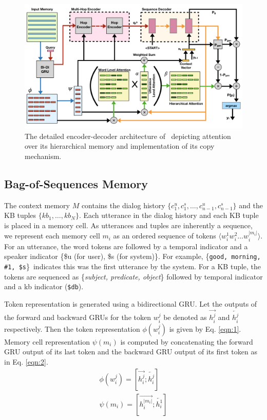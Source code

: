 \begin{figure}[t]
\centering
\includegraphics[scale=0.4]{assets/paper_arch.png}
\caption{The detailed encoder-decoder architecture of \sys\ depicting attention over its hierarchical memory and implementation of its copy mechanism.}
\label{fig:fullsystem}
\end{figure}

\subsection{Bag-of-Sequences Memory} 
\label{sec:hmemory}
The context memory $M$ contains the dialog history $\{c_1^u, c_1^s, \ldots, c_{n-1}^u, c_{n-1}^s\}$ and the KB tuples $\{kb_1, \ldots, kb_{N}\}$. Each utterance in the dialog history and each KB tuple is placed in a memory cell. As utterances and tuples are inherently a sequence, we represent each memory cell $m_i$ as an ordered sequence of tokens $\langle w^1_i w^2_i \ldots w^{|m_i|}_i\rangle$. For an utterance, the word tokens are followed by a temporal indicator and a speaker indicator \{\$u (for user), \$s (for system)\}. For example, \{\texttt{good, morning, \#1, \$s}\}\ indicates this was the first utterance by the system. For a KB tuple, the tokens are sequenced as \{\textit{subject, predicate, object}\} followed by temporal indicator and a kb indicator (\texttt{\$db}).

Token representation is generated using a bidirectional GRU. Let the outputs of the forward and backward GRUs for the token $w^j_i$ be denoted as $\overrightarrow{h^j_{i}}$ and $\overleftarrow{h^j_{i}}$ respectively. Then the token representation $\phi(w^j_i)$ is given by Eq. \ref{eqn:1}. Memory cell representation $\psi(m_i)$ is computed by concatenating the forward GRU output of its last token and the backward GRU output of its first token as in Eq. \ref{eqn:2}. 
\begin{eqnarray}
\phi(w^j_i)=[\overrightarrow{h^j_{i}};\overleftarrow{h_{i}^j}] \label{eqn:1} \\
\psi(m_i)=[\overrightarrow{h_{i}^{|m_i|}};\overleftarrow{h_{i}^1}] \label{eqn:2}
\end{eqnarray}


